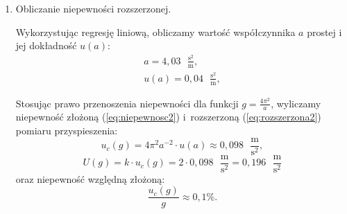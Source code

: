 \documentclass [a4paper,11pt]{article}
\begin{document}
\begin{enumerate}[label=\alph*)]
		\item Obliczanie niepewności rozszerzonej.
		
		Wykorzystując regresję liniową, obliczamy wartość współczynnika $a$ prostej i  jej dokładność $u(a)$:
		\begin{align}
		a = 4,03 \text{ }\mathrm{\frac{s^2}{m}},\label{a} \\
		u(a) = 0,04 \text{ }\mathrm{\frac{s^2}{m}},
		\end{align}
		
		Stosując prawo przenoszenia niepewności dla funkcji $g = \frac{4\pi^2}{a}$, wyliczamy niepewność złożoną (\ref{eq:niepewnosc2}) i~rozszerzoną (\ref{eq:rozszerzona2}) pomiaru przyspieszenia:
		\begin{equation}
		\label{eq:niepewnosc2}
		u_c(g) = 4\pi^2a^{-2} \cdot u(a) \approx 0,098 \text{ }\mathrm{\frac{m}{s^2}},
		\end{equation}
		\begin{equation}
		\label{eq:rozszerzona2}
		U(g) = k\cdot u_c(g) = 2 \cdot 0,098 \text{ }\mathrm{\frac{m}{s^2}} = 0,196 \text{ }\mathrm{\frac{m}{s^2}}
		\end{equation}
		oraz niepewność względną złożoną:
		\begin{equation}
		\label{eq:niepewnoscwzgl2}
		\frac{u_c(g)}{g} \approx  0,1 \%\text{.}
		\end{equation}
	\end{enumerate}
\end{document}
